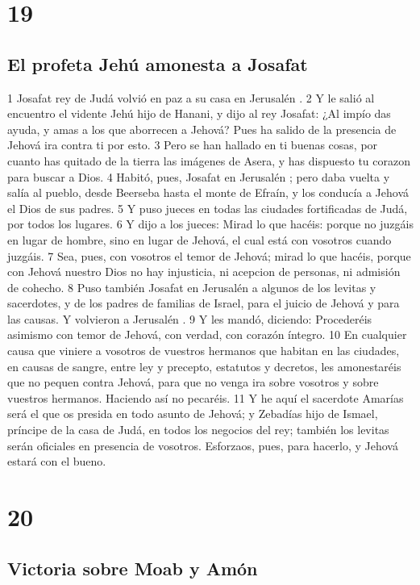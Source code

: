 \chapter{19}

\section*{El profeta Jehú amonesta a Josafat}


1 Josafat rey de Judá volvió en paz a su casa en Jerusalén .
2 Y le salió al encuentro el vidente Jehú hijo de Hanani, y dijo al rey Josafat: ¿Al impío das ayuda, y amas a los que aborrecen a Jehová? Pues ha salido de la presencia de Jehová ira contra ti por esto.
3 Pero se han hallado en ti buenas cosas, por cuanto has quitado de la tierra las imágenes de Asera, y has dispuesto tu corazon para buscar a Dios.
4 Habitó, pues, Josafat en Jerusalén ; pero daba vuelta y salía al pueblo, desde Beerseba hasta el monte de Efraín, y los conducía a Jehová el Dios de sus padres.
5 Y puso jueces en todas las ciudades fortificadas de Judá, por todos los lugares.
6 Y dijo a los jueces: Mirad lo que hacéis: porque no juzgáis en lugar de hombre, sino en lugar de Jehová, el cual está con vosotros cuando juzgáis.
7 Sea, pues, con vosotros el temor de Jehová; mirad lo que hacéis, porque con Jehová nuestro Dios no hay injusticia, ni acepcion de personas, ni admisión de cohecho.
8 Puso también Josafat en Jerusalén a algunos de los levitas y sacerdotes, y de los padres de familias de Israel, para el juicio de Jehová y para las causas. Y volvieron a Jerusalén .
9 Y les mandó, diciendo: Procederéis asimismo con temor de Jehová, con verdad,  con corazón íntegro.
10 En cualquier causa que viniere a vosotros de vuestros hermanos que habitan en las ciudades, en causas de sangre, entre ley y precepto, estatutos y decretos, les amonestaréis que no pequen contra Jehová, para que no venga ira sobre vosotros y sobre vuestros hermanos. Haciendo así no pecaréis.
11 Y he aquí el sacerdote Amarías será el que os presida en todo asunto de Jehová; y Zebadías hijo de Ismael, príncipe de la casa de Judá, en todos los negocios del rey; también los levitas serán oficiales en presencia de vosotros. Esforzaos, pues, para hacerlo, y Jehová estará con el bueno.

\chapter{20}

\section*{Victoria sobre Moab y Amón}


